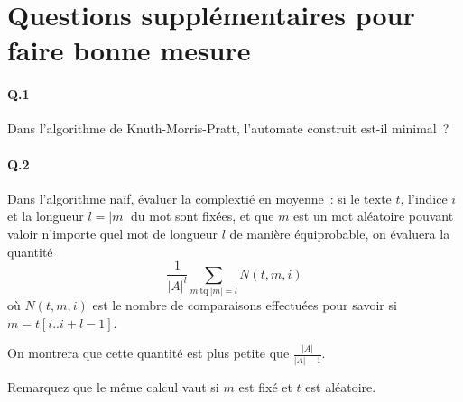 \documentclass[10pt,a4paper]{article}
\begin{document}
\section{Questions supplémentaires pour faire bonne mesure}
\paragraph{Q.1} Dans l'algorithme de Knuth-Morris-Pratt, l'automate construit 
est-il minimal~?
\paragraph{Q.2} Dans l'algorithme naïf, évaluer la complextié en moyenne~: si 
le texte $t$, l'indice $i$ et la longueur $l=|m|$ du mot sont fixées, et que $m$ 
est un mot aléatoire pouvant valoir n'importe quel mot de longueur $l$ de manière 
équiprobable, on évaluera la quantité
\[\frac1{|A|^l} \sum_{ m \ \mathrm{tq} \ |m| = l} N(t,m,i) \]
où $N(t,m,i)$ est le nombre de comparaisons effectuées pour savoir si 
$m=t[i..i+l-1]$.

On montrera que cette quantité est plus petite que $\frac{|A|}{|A|-1}$.

Remarquez que le même calcul vaut si $m$ est fixé et $t$ est aléatoire.
\end{document}
